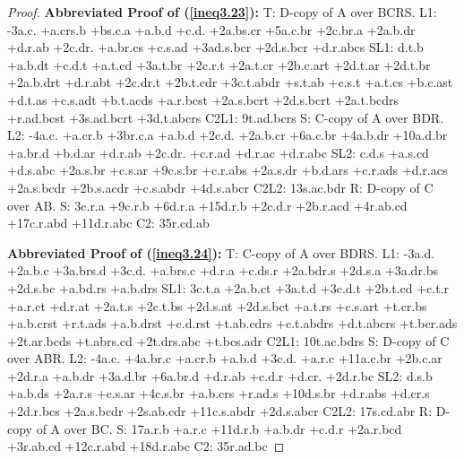 \documentclass[10pt,journal]{IEEEtran}
\begin{document}
\begin{proof}
{\bf Abbreviated Proof of (\ref{ineq3.23}):}
T: D-copy of A over BCRS.\newline
L1: -3a.c. +a.crs.b +bs.c.a +a.b.d +c.d. +2a.bs.cr +5a.c.br +2c.br.a +2a.b.dr +d.r.ab +2c.dr. +a.br.cs +c.s.ad +3ad.s.bcr +2d.s.bcr +d.r.abcs\newline
SL1: d.t.b +a.b.dt +c.d.t +a.t.cd +3a.t.br +2c.r.t +2a.t.cr +2b.c.art +2d.t.ar +2d.t.br +2a.b.drt +d.r.abt +2c.dr.t +2b.t.cdr +3c.t.abdr +s.t.ab +c.s.t +a.t.cs +b.c.ast +d.t.as +c.s.adt +b.t.acds +a.r.bcst +2a.s.bcrt +2d.s.bcrt +2a.t.bcdrs +r.ad.bcst +3s.ad.bcrt +3d.t.abcrs
C2L1: 9t.ad.bcrs\newline
S: C-copy of A over BDR.\newline
L2: -4a.c. +a.cr.b +3br.c.a +a.b.d +2c.d. +2a.b.cr +6a.c.br +4a.b.dr +10a.d.br +a.br.d +b.d.ar +d.r.ab +2c.dr. +c.r.ad +d.r.ac +d.r.abc\newline
SL2: c.d.s +a.s.cd +d.s.abc +2a.s.br +c.s.ar +9c.s.br +c.r.abs +2a.s.dr +b.d.ars +c.r.ads +d.r.acs +2a.s.bcdr +2b.s.acdr +c.s.abdr +4d.s.abcr\newline
C2L2: 13s.ac.bdr\newline
R: D-copy of C over AB.\newline
S: 3c.r.a +9c.r.b +6d.r.a +15d.r.b +2c.d.r +2b.r.acd +4r.ab.cd +17c.r.abd +11d.r.abc\newline
C2: 35r.cd.ab\newline


{\bf Abbreviated Proof of (\ref{ineq3.24}):}
T: C-copy of A over BDRS.\newline
L1: -3a.d. +2a.b.c +3a.brs.d +3c.d. +a.brs.c +d.r.a +c.ds.r +2a.bdr.s +2d.s.a +3a.dr.bs +2d.s.bc +a.bd.rs +a.b.drs\newline
SL1: 3c.t.a +2a.b.ct +3a.t.d +3c.d.t +2b.t.cd +c.t.r +a.r.ct +d.r.at +2a.t.s +2c.t.bs +2d.s.at +2d.s.bct +a.t.rs +c.s.art +t.cr.bs +a.b.crst +r.t.ads +a.b.drst +c.d.rst +t.ab.cdrs +c.t.abdrs +d.t.abcrs +t.bcr.ads +2t.ar.bcds +t.abrs.cd +2t.drs.abc +t.bcs.adr
C2L1: 10t.ac.bdrs\newline
S: D-copy of C over ABR.\newline
L2: -4a.c. +4a.br.c +a.cr.b +a.b.d +3c.d. +a.r.c +11a.c.br +2b.c.ar +2d.r.a +a.b.dr +3a.d.br +6a.br.d +d.r.ab +c.d.r +d.cr. +2d.r.bc\newline
SL2: d.s.b +a.b.ds +2a.r.s +c.s.ar +4c.s.br +a.b.crs +r.ad.s +10d.s.br +d.r.abs +d.cr.s +2d.r.bcs +2a.s.bcdr +2s.ab.cdr +11c.s.abdr +2d.s.abcr\newline
C2L2: 17s.cd.abr\newline
R: D-copy of A over BC.\newline
S: 17a.r.b +a.r.c +11d.r.b +a.b.dr +c.d.r +2a.r.bcd +3r.ab.cd +12c.r.abd +18d.r.abc\newline
C2: 35r.ad.bc\newline



\end{proof}
\end{document}
